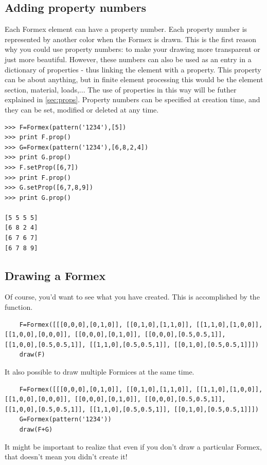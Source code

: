 \documentclass[a4paper]{manual}
\begin{document}
{\subsection{Adding property numbers}
\label{subsec:propnr}
Each Formex element can have a property number. Each property number is represented by another color when the Formex is drawn. This is the first reason why you could use property numbers: to make your drawing more transparent or just more beautiful. However, these numbers can also be used as an entry in a dictionary of properties - thus linking the element with a property. This property can be about anything, but in finite element processing this would be the element section, material, loads,... The use of properties in this way will be futher explained in \ref{sec:props}.
Property numbers can be specified at creation time, and they can be set, modified or deleted at any time.  
\begin{verbatim}
>>> F=Formex(pattern('1234'),[5])
>>> print F.prop()
>>> G=Formex(pattern('1234'),[6,8,2,4])
>>> print G.prop()
>>> F.setProp([6,7])
>>> print F.prop()
>>> G.setProp([6,7,8,9])
>>> print G.prop()

[5 5 5 5]
[6 8 2 4]
[6 7 6 7]
[6 7 8 9]
\end{verbatim}

\subsection{Drawing a Formex}
\label{subsec:drawing}
Of course, you'd want to see what you have created. This is accomplished by the  function. 
\begin{verbatim}
	F=Formex([[[0,0,0],[0,1,0]], [[0,1,0],[1,1,0]], [[1,1,0],[1,0,0]], [[1,0,0],[0,0,0]], [[0,0,0],[0,1,0]], [[0,0,0],[0.5,0.5,1]], 		[[1,0,0],[0.5,0.5,1]], [[1,1,0],[0.5,0.5,1]], [[0,1,0],[0.5,0.5,1]]])
	draw(F)
\end{verbatim}

It also possible to draw multiple Formices at the same time.
\begin{verbatim}
	F=Formex([[[0,0,0],[0,1,0]], [[0,1,0],[1,1,0]], [[1,1,0],[1,0,0]], [[1,0,0],[0,0,0]], [[0,0,0],[0,1,0]], [[0,0,0],[0.5,0.5,1]], 		[[1,0,0],[0.5,0.5,1]], [[1,1,0],[0.5,0.5,1]], [[0,1,0],[0.5,0.5,1]]])	
	G=Formex(pattern('1234'))
	draw(F+G)
\end{verbatim}
 
It might be important to realize that even if you don't draw a particular Formex, that doesn't mean you didn't create it!

}
\end{document}
